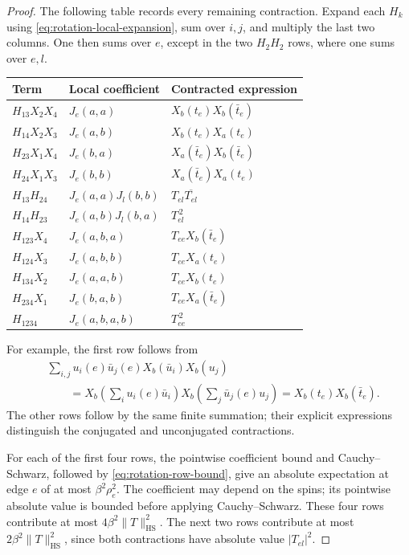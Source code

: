 \begin{proof}
The following table records every remaining contraction. Expand each
\(H_k\) using \eqref{eq:rotation-local-expansion}, sum over \(i,j\),
and multiply the last two columns. One then sums over \(e\), except
in the two \(H_2H_2\) rows, where one sums over \(e,l\).
\begin{center}
\renewcommand{\arraystretch}{1.18}
\begin{tabular}{@{}lll@{}}
\toprule
Term & Local coefficient & Contracted expression\\
\midrule
\(H_{13}X_2X_4\) & \(J_e(a,a)\)
  & \(X_b(t_e)X_b(\bar t_e)\)\\
\(H_{14}X_2X_3\) & \(J_e(a,b)\)
  & \(X_b(t_e)X_a(t_e)\)\\
\(H_{23}X_1X_4\) & \(J_e(b,a)\)
  & \(X_a(\bar t_e)X_b(\bar t_e)\)\\
\(H_{24}X_1X_3\) & \(J_e(b,b)\)
  & \(X_a(\bar t_e)X_a(t_e)\)\\
\midrule
\(H_{13}H_{24}\) & \(J_e(a,a)J_l(b,b)\)
  & \(T_{el}\overline{T_{el}}\)\\
\(H_{14}H_{23}\) & \(J_e(a,b)J_l(b,a)\)
  & \(T_{el}^{\,2}\)\\
\midrule
\(H_{123}X_4\) & \(J_e(a,b,a)\)
  & \(T_{ee}X_b(\bar t_e)\)\\
\(H_{124}X_3\) & \(J_e(a,b,b)\)
  & \(T_{ee}X_a(t_e)\)\\
\(H_{134}X_2\) & \(J_e(a,a,b)\)
  & \(T_{ee}X_b(t_e)\)\\
\(H_{234}X_1\) & \(J_e(b,a,b)\)
  & \(T_{ee}X_a(\bar t_e)\)\\
\midrule
\(H_{1234}\) & \(J_e(a,b,a,b)\) & \(T_{ee}^{\,2}\)\\
\bottomrule
\end{tabular}
\end{center}
For example, the first row follows from
\[
\begin{split}
&\sum_{i,j}u_i(e)\bar u_j(e)
             X_b(\bar u_i)X_b(u_j)\\
&\qquad=
X_b\left(\sum_i u_i(e)\bar u_i\right)
X_b\left(\sum_j\bar u_j(e)u_j\right)
=X_b(t_e)X_b(\bar t_e).
\end{split}
\]
The other rows follow by the same finite summation; their explicit
expressions distinguish the conjugated and unconjugated contractions.

For each of the first four rows, the pointwise coefficient bound and
Cauchy--Schwarz, followed by \eqref{eq:rotation-row-bound}, give an
absolute expectation at edge \(e\) of at most
\(\beta^2\rho_e^2\). The coefficient may depend on the spins;
its pointwise absolute value is bounded before applying
Cauchy--Schwarz. These four rows contribute at most
\(4\beta^2\|T\|_{\mathrm{HS}}^2\).
The next two rows contribute at most
\(2\beta^2\|T\|_{\mathrm{HS}}^2\), since both contractions have
absolute value \(|T_{el}|^2\).


\end{proof}
